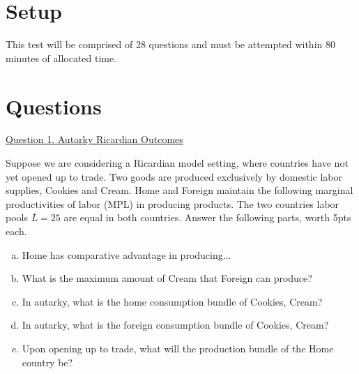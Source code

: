 \documentclass[12pt]{article}
\begin{document}
\singlespacing


\bigskip

\doublespacing



\section*{Setup}

\noindent 
This test will be comprised of 28 questions and must be attempted within 80 minutes of allocated time. 
\section*{Questions}

\noindent \underline{Question 1. Autarky Ricardian Outcomes}

\noindent Suppose we are considering a Ricardian model setting, where countries have not yet opened up to trade.
Two goods are produced exclusively by domestic labor supplies, Cookies and Cream. 
Home and Foreign maintain the following marginal productivities of labor (MPL) in producing products. 
The two countries labor pools $\bar{L}=25$ are equal in both countries.
Answer the following parts, worth 5pts each.

\begin{enumerate}[a)]
	
	\item Home has comparative advantage in producing...
	
	\vspace{1in}
	
	\item What is the maximum amount of Cream that Foreign can produce?
	
	\vspace{1in}
	
	\newpage
	
	\item In autarky, what is the home consumption bundle of {Cookies, Cream}?
	
	\vspace{2.8in}
	
	\item In autarky, what is the foreign consumption bundle of {Cookies, Cream}?  
	
	\vspace{2.8in}
	
	\item Upon opening up to trade, what will the production bundle of the Home country be?
	
	
\end{enumerate}
\end{document}
